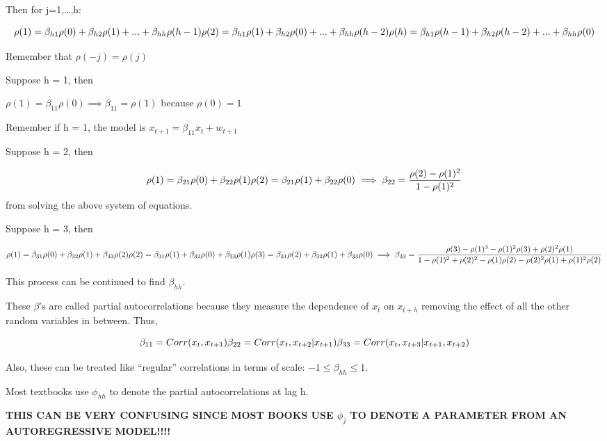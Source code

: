 \documentclass[
]{book}
\theoremstyle{definition}
\theoremstyle{definition}
\theoremstyle{definition}
\theoremstyle{definition}
\theoremstyle{remark}
\begin{document}
Then for j=1,\ldots,h:

\[\rho(1)=\beta_{h1}\rho(0)+\beta_{h2}\rho(1)+...+\beta_{hh}\rho(h-1)\\
\rho(2)=\beta_{h1}\rho(1)+\beta_{h2}\rho(0)+...+\beta_{hh}\rho(h-2)\\
\rho(h)=\beta_{h1}\rho(h-1)+\beta_{h2}\rho(h-2)+...+\beta_{hh}\rho(0)\]

Remember that \(\rho(-j) = \rho(j)\)

Suppose h = 1, then

\(\rho(1) = \beta_{11}\rho(0) \implies \beta_{11} = \rho(1)\) because \(\rho(0) = 1\)

Remember if h = 1, the model is \(x_{t+1}=\beta_{11}x_t+w_{t+1}\)

Suppose h = 2, then

\[\rho(1) = \beta_{21}\rho(0) + \beta_{22}\rho(1)\\
\rho(2) = \beta_{21}\rho(1) + \beta_{22}\rho(0)\\
\implies \beta_{22} = \frac{\rho(2)-\rho(1)^2}{1-\rho(1)^2}\] from solving the above system of equations.

Suppose h = 3, then

\[\rho(1) = \beta_{31}\rho(0) + \beta_{32}\rho(1)+\beta_{33}\rho(2)\\
\rho(2) = \beta_{31}\rho(1) + \beta_{32}\rho(0)+\beta_{33}\rho(1)\\
\rho(3) = \beta_{31}\rho(2) + \beta_{32}\rho(1)+\beta_{33}\rho(0)\\
\implies \beta_{33} = \frac{\rho(3)-\rho(1)^3-\rho(1)^2\rho(3)+\rho(2)^2\rho(1)}{1-\rho(1)^2+\rho(2)^2-\rho(1)\rho(2)-\rho(2)^2\rho(1)+\rho(1)^2\rho(2)}\]

This process can be continued to find \(\beta_{hh}\).

These \(\beta\)'s are called partial autocorrelations because they measure the dependence of \(x_t\) on \(x_{t+h}\) removing the effect of all the other random variables in between. Thus,

\[\beta_{11}=Corr(x_t, x_{t+1})\\
\beta_{22}=Corr(x_t,x_{t+2}| x_{t+1})\\
\beta_{33}=Corr(x_t, x_{t+3}| x_{t+1}, x_{t+2})\]

Also, these can be treated like ``regular'' correlations in terms of scale: \(-1 \le \beta_{hh} \le 1\).

Most textbooks use \(\phi_{hh}\) to denote the partial autocorrelations at lag h.

\textbf{THIS CAN BE VERY CONFUSING SINCE MOST BOOKS USE \(\phi_j\) TO DENOTE A PARAMETER FROM AN AUTOREGRESSIVE MODEL!!!!}
\end{document}
